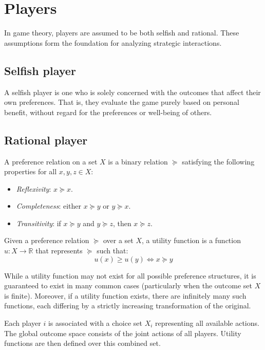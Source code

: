 \section{Players}

In game theory, players are assumed to be both selfish and rational. 
These assumptions form the foundation for analyzing strategic interactions.

\subsection{Selfish player}
A selfish player is one who is solely concerned with the outcomes that affect their own preferences. 
That is, they evaluate the game purely based on personal benefit, without regard for the preferences or well-being of others.

\subsection{Rational player}
\begin{definition}
    A preference relation on a set $X$ is a binary relation $\succeq$ satisfying the following properties for all $x, y, z \in X$:
    \begin{itemize}
        \item \textit{Reflexivity}: $x \succeq x$.
        \item \textit{Completeness}: either $x \succeq y$ or $y \succeq x$.
        \item \textit{Transitivity}: if $x \succeq y$ and $y \succeq z$, then $x \succeq z$.
    \end{itemize}
\end{definition}

\begin{definition}
    Given a preference relation $\succeq$ over a set $X$, a utility function is a function $u:X\rightarrow\mathbb{R}$ that represents $\succeq$ such that:
    \[u(x)\geq u(y)\Leftrightarrow x \succeq y\]
\end{definition}
\noindent While a utility function may not exist for all possible preference structures, it is guaranteed to exist in many common cases (particularly when the outcome set $X$ is finite).
Moreover, if a utility function exists, there are infinitely many such functions, each differing by a strictly increasing transformation of the original.

Each player $i$ is associated with a choice set $X_i$ representing all available actions.
The global outcome space consists of the joint actions of all players.
Utility functions are then defined over this combined set.

